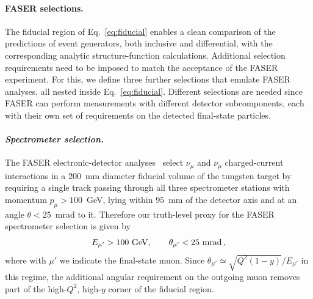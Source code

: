 \paragraph{FASER selections.}
\label{sec:faser-selections}
%
The fiducial region of Eq.~\eqref{eq:fiducial} enables a clean comparison of the predictions of event generators, both inclusive and differential, with the corresponding analytic structure-function calculations.
%
Additional selection requirements need to be imposed to match the acceptance of the FASER experiment.
%
For this, we define three further
selections that emulate FASER analyses, all nested 
inside Eq.~\eqref{eq:fiducial}.
%
Different selections are needed since FASER can perform measurements with different detector subcomponents, each with their own set of requirements on the detected final-state particles.  

\paragraph{\it Spectrometer selection.}  The FASER electronic-detector analyses~\cite{FASER:2023zcr,FASER:2024ref,FASER:2026enu2d} select $\nu_\mu$ and $\bar{\nu}_\mu$ charged-current interactions in a $200$~mm diameter fiducial volume of the tungsten target by requiring a single track passing through all three spectrometer stations with momentum $p_\mu > 100$~GeV, lying within $95$~mm of the detector axis and at an angle $\theta < 25$~mrad to it. 
%
Therefore our truth-level proxy for the FASER spectrometer selection is given by
\begin{equation}
  E_{\mu'} > 100~{\rm GeV} , \qquad \theta_{\mu'} < 25~{\rm mrad} \, ,
  \label{eq:tierS}
\end{equation}
where with $\mu'$ we indicate the final-state muon. 
%
Since $\theta_{\mu'} \simeq \sqrt{Q^2(1-y)}/E_{\mu'}$ in this regime, the additional angular requirement on the outgoing muon removes part of the  high-$Q^2$, high-$y$ corner of the fiducial region.


